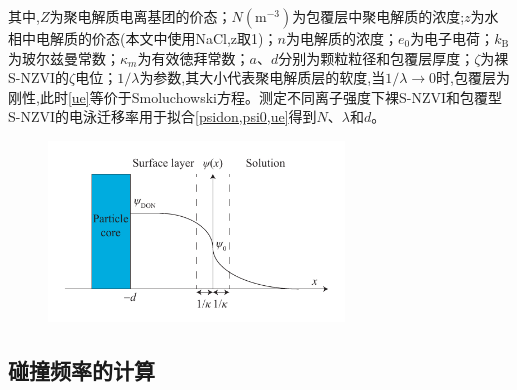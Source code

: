 其中,$Z$为聚电解质电离基团的价态；$N(\mathrm{m^{-3}})$为包覆层中聚电解质的浓度;$z$为水相中电解质的价态(本文中使用NaCl,z取1)；$n$为电解质的浓度；$e_0$为电子电荷；$k_\mathrm{B}$为玻尔兹曼常数；$\kappa_m$为有效徳拜常数；$a$、$d$分别为颗粒粒径和包覆层厚度；$\zeta$为裸S-NZVI的$\zeta$电位；$1/\lambda$为参数,其大小代表聚电解质层的软度,当$1/\lambda\rightarrow 0$时,包覆层为刚性,此时\cref{ue}等价于Smoluchowski方程。测定不同离子强度下裸S-NZVI和包覆型S-NZVI的电泳迁移率用于拟合\cref{psidon,psi0,ue}得到$N$、$\lambda$和$d$。

\begin{figure}
    \centering
    \includegraphics[width=0.7\textwidth]{figs/Donnan-potential.pdf}
    \label{fig4}
\end{figure}

\subsection{碰撞频率的计算}

